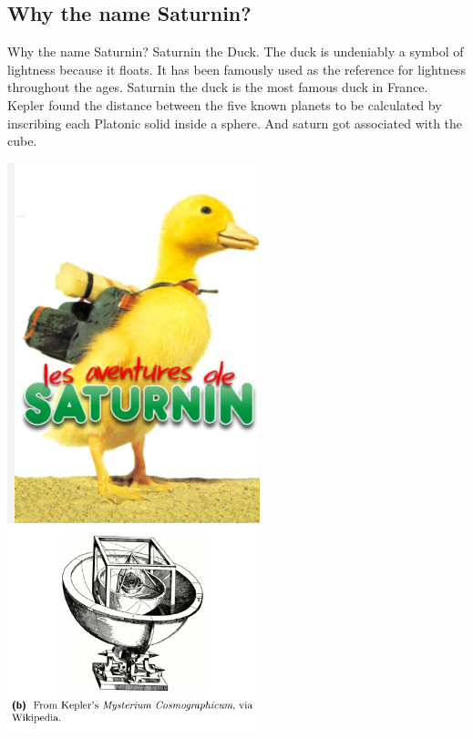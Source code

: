 \subsection{Why the name Saturnin?}
\begin{frame}{Why the name Saturnin?}
    Saturnin the Duck. The duck is undeniably a symbol of lightness because it floats. It has been famously used as the reference for lightness throughout the ages. Saturnin the duck is the most famous duck in France.
    \\
    Kepler found the distance between the five known planets to be calculated by inscribing each Platonic solid inside a sphere. And saturn got associated with the cube.
    \begin{center}  \includegraphics[width=0.55\textwidth,height=0.6\textheight,keepaspectratio]{Images/Figures/duck.png}
    \includegraphics[width=0.55\textwidth,height=0.6\textheight,keepaspectratio]{Images/Figures/kepler.png}

\end{center}
\end{frame}
